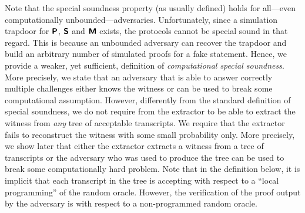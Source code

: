 Note that the special soundness property (as usually defined) holds for
all---even computationally unbounded---adversaries. Unfortunately, since a
simulation trapdoor for $\bm{\mathsf{P}}$, $\bm{\mathsf{S}}$ and $\bm{\mathsf{M}}$ exists, the protocols
cannot be special sound in that regard. This is because an unbounded adversary
can recover the trapdoor and build an arbitrary number of simulated proofs for a fake
statement. Hence, we provide a weaker, yet sufficient, definition of
\emph{computational special soundness}. More precisely, we state that an
adversary that is able to answer correctly multiple challenges either knows the
witness or can be used to break some computational assumption. However, differently from the standard definition of special soundness, we do not require from the extractor to be able to extract the witness from \emph{any} tree of acceptable transcripts.  We require that the extractor fails to reconstruct the witness with some small probability only. More precisely, we show later that either the extractor extracts a witness from a tree of transcripts or the adversary who was used to produce the tree can be used to break some computationally hard problem. Note that in the definition below, it is implicit that each transcript in the tree is accepting with respect to a ``local programming'' of the random oracle. However, the verification of the proof output by the adversary is with respect to a non-programmed random oracle.


